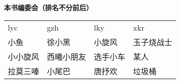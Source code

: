 \thispagestyle{empty}
\begin{titlepage}
\thispagestyle{empty}
    \begin{center}
    
    {\makeatletter
    \ifdefvoid{\@bookseries}{}{\bigskip\normalfont\fontsize{20}{20}\selectfont\@bookseries}
    \makeatother}

        \bigskip
        \bigskip

    {\makeatletter
    \fontsize{35}{35}\rmfamily\bfseries\selectfont\@title
    \makeatother}
    
    \bigskip
    \bigskip
    
    \bigskip
    \bigskip
    \bigskip

    {\makeatletter
\vspace{8em}
    \fontsize{25}{25}\rmfamily\bfseries\selectfont 本书编委会（排名不分前后）
    \bigskip

    \begin{table}[h]
    \centering
    \fontsize{20}{20}\rmfamily\mdseries\selectfont
\begin{tabular}{llll}
lyc  & gzh   & lky  & xkr   \\
小鱼   & 徐小黑   & 小旋风  & 玉子烧战士 \\
小小旋风 & 西曦小朋友 & 选手小车 & 某人    \\
拉莫三嗪 & 小尾巴   & 唐抒欢  & 垃圾桶  
\end{tabular}
\end{table}
    \makeatother}
    
    \bigskip
    \bigskip

    
    \vfill
    
    
    \bigskip
    \bigskip
    
    {\makeatletter
    \fontsize{25}{25}\rmfamily\selectfont\@pressname
    \makeatother}
    \end{center}
    
    \end{titlepage}
    \let\cleardoublepage\clearpage

